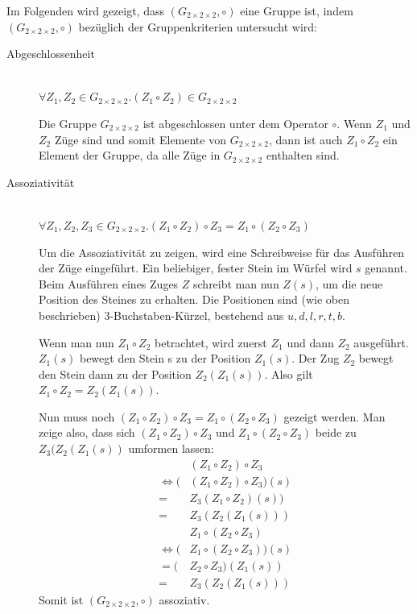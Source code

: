 \documentclass[12pt,a4paper, usenames, dvipsnames]{article}
\theoremstyle{mystyle}
\theoremstyle{definition}
\newcommand{\Gtwo}{\ensuremath{G_{2\times 2\times 2}}}
\begin{document}
Im Folgenden wird gezeigt, dass $(\Gtwo, \circ)$ eine Gruppe ist, indem $(\Gtwo, \circ)$ bezüglich der Gruppenkriterien untersucht wird:
\begin{description}
\item [Abgeschlossenheit] \ \\
$\forall Z_1,Z_2 \in \Gtwo .  (Z_1 \circ Z_2) \in \Gtwo $ 


Die Gruppe $\Gtwo$ ist abgeschlossen unter dem Operator $\circ$. Wenn $Z_1 $ und $Z_2$ Züge sind und somit Elemente von $\Gtwo$, dann ist auch $Z_1 \circ Z_2$ ein Element der Gruppe, da alle Züge in $\Gtwo$ enthalten sind. 



\item [Assoziativität] \ \\
$\forall Z_1,Z_2,Z_3 \in \Gtwo.(Z_1 \circ Z_2) \circ Z_3 = Z_1 \circ (Z_2 \circ Z_3)$ 


Um die Assoziativität zu zeigen, wird eine Schreibweise für das Ausführen der Züge eingeführt. Ein beliebiger, fester Stein im Würfel wird $s$ genannt. Beim Ausführen eines Zuges $Z$ schreibt man nun $Z(s)$, um die neue Position des Steines zu erhalten. Die Positionen sind (wie oben beschrieben) 3-Buchstaben-Kürzel, bestehend aus $u, d, l, r, t, b$. 

Wenn man nun $Z_1 \circ Z_2 $ betrachtet, wird zuerst $Z_1$ und dann $Z_2$ ausgeführt. $Z_1(s)$ bewegt den Stein s zu der Position $Z_1(s)$. Der Zug $Z_2$ bewegt den Stein dann zu der Position $Z_2(Z_1(s))$. Also gilt $Z_1 \circ Z_2 = Z_2(Z_1(s))$. 


Nun muss noch $(Z_1 \circ Z_2) \circ Z_3 = Z_1 \circ (Z_2 \circ Z_3)$ gezeigt werden. Man zeige also, dass sich $(Z_1 \circ Z_2) \circ Z_3$ und $Z_1 \circ (Z_2 \circ Z_3)$ beide zu $Z_3(Z_2(Z_1(s))$ umformen lassen: 
\begin{align*}
& (Z_1 \circ Z_2) \circ Z_3  \\
\Leftrightarrow (&(Z_1 \circ Z_2) \circ Z_3)(s) \\
= & Z_3(Z_1 \circ Z_2)(s)) \\
= & Z_3(Z_2(Z_1(s)))  
\end{align*}
\begin{align*}
&Z_1 \circ (Z_2 \circ Z_3) \\
\Leftrightarrow (&Z_1 \circ (Z_2 \circ Z_3))(s) \\
= (&Z_2 \circ Z_3)(Z_1(s)) \\
= \ \ & Z_3(Z_2(Z_1(s)))  
\end{align*}
Somit ist $(\Gtwo, \circ)$ assoziativ.


\end{description}
\end{document}
